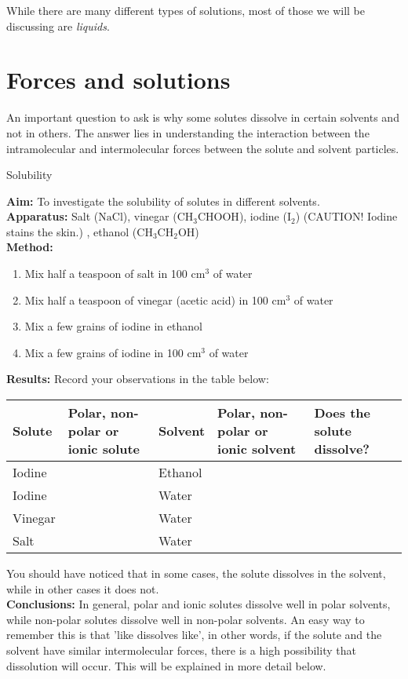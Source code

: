 While there are many different types of solutions, most of those we will  be discussing are \textit{liquids}.\\

\section{Forces and solutions}
\label{sec:soln:forces}

An important question to ask is why some solutes dissolve in certain solvents and not in others. The answer lies in understanding the interaction between the intramolecular and intermolecular forces between the solute and solvent particles.

\begin{g_experiment}{Solubility}{

\textbf{Aim: } To investigate the solubility of solutes in different solvents.\\
\textbf{Apparatus: } Salt ($\text{NaCl}$), vinegar ($\text{CH}_3\text{CHOOH}$), iodine ($\text{I}_2$) (CAUTION! Iodine stains the skin.) , ethanol ($\text{CH}_3\text{CH}_2\text{OH}$)\\
\textbf{Method: } \begin{enumerate}
\item{Mix half a teaspoon of salt in 100 cm$^{3}$ of water}
\item{Mix half a teaspoon of vinegar (acetic acid) in 100 cm$^{3}$ of water}
\item{Mix a few grains of iodine in ethanol}
\item{Mix a few grains of iodine in 100 cm$^{3}$ of water}
\end{enumerate}
\textbf{Results: } Record your observations in the table below:
\begin{center}
\begin{tabular}{|p{1.3cm}|p{2.5cm}|p{1.3cm}|p{2.5cm}|p{2cm}|}\hline
\textbf{Solute} & \textbf{Polar, non-polar or ionic solute} & \textbf{Solvent} & \textbf{Polar, non-polar or ionic solvent} & \textbf{Does the solute dissolve?}\\\hline
Iodine & & Ethanol & & \\\hline
Iodine & & Water & & \\\hline
Vinegar & & Water & & \\\hline
Salt & & Water & & \\\hline
\end{tabular}
\end{center}
You should have noticed that in some cases, the solute dissolves in the solvent, while in other cases it does not.\\
\textbf{Conclusions: } In general, polar and ionic solutes dissolve well in polar solvents, while non-polar solutes dissolve well in non-polar solvents. An easy way to remember this is that 'like dissolves like', in other words, if the solute and the solvent have similar intermolecular forces, there is a high possibility that dissolution will occur. This will be explained in more detail below.
}
\end{g_experiment}
